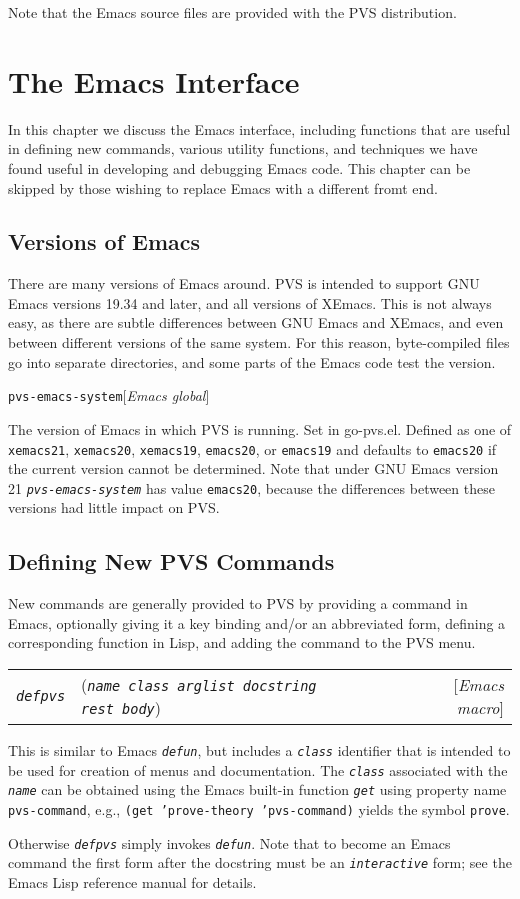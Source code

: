 \documentclass[12pt]{book}
\makeatletter
\newcommand{\indtt}[1]{\texttt{#1}\index{#1@\texttt{#1}}}  %
\def\htgt#1{\hypertarget{#1}{\indtt{#1}}}
\def\amprest{{\smaller\sc {\smaller\smaller \&}rest\ }}
\newenvironment{function}[3]%
{\par\noindent\begin{boxedminipage}{\textwidth}%
 \par\noindent\begin{tabularx}{\linewidth}{l>{\raggedright}Xr}%
 \functionhtgt{#1}&(\texttt{\textit{#2}})&[\emph{#3}]%
 \end{tabularx}\par\flushright\begin{minipage}{.97\textwidth}}
{\end{minipage}\end{boxedminipage}}
\newcommand{\functionnm}[1]{\texttt{\textit{#1}}}
\newcommand{\functionhtgt}[1]{\hypertarget{#1}{\functionnm{#1}}\index{#1@\functionnm{#1}|underline}}
\newenvironment{emacsmacro}[2]%
{\begin{function}{#1}{#2}{Emacs macro}}{\end{function}}
\newenvironment{emacsglobalvar}[1]%
{\par\noindent\begin{boxedminipage}{\textwidth}%
 \par\noindent\texttt{\htgt{#1}}\hfill[\emph{Emacs global}]%
 \par\flushright\begin{minipage}{.97\textwidth}}
{\end{minipage}\end{boxedminipage}}
\makeatother
\begin{document}
Note that the Emacs source files are provided with the PVS distribution.

\section{The Emacs Interface}
\label{emacs-interface}

In this chapter we discuss the Emacs interface, including functions that
are useful in defining new commands, various utility functions, and
techniques we have found useful in developing and debugging Emacs code.
This chapter can be skipped by those wishing to replace Emacs with a
different fromt end.

\subsection{Versions of Emacs}

There are many versions of Emacs around.  PVS is intended to support GNU
Emacs versions 19.34 and later, and all versions of XEmacs.  This is not
always easy, as there are subtle differences between GNU Emacs and XEmacs,
and even between different versions of the same system.  For this reason,
byte-compiled files go into separate directories, and some parts of the
Emacs code test the version.

\begin{emacsglobalvar}{pvs-emacs-system}
The version of Emacs in which PVS is running. Set in go-pvs.el.  Defined
as one of \texttt{xemacs21}, \texttt{xemacs20}, \texttt{xemacs19},
\texttt{emacs20}, or \texttt{emacs19} and defaults to \texttt{emacs20} if
the current version cannot be determined.  Note that under GNU Emacs
version 21 \functionnm{pvs-emacs-system} has value \texttt{emacs20},
because the differences between these versions had little impact on PVS.
\end{emacsglobalvar}

\subsection{Defining New PVS Commands}

New commands are generally provided to PVS by providing a command in
Emacs, optionally giving it a key binding and/or an abbreviated form,
defining a corresponding function in Lisp, and adding the command to the
PVS menu.

\begin{emacsmacro}{defpvs}{name class arglist docstring \amprest body}
This is similar to Emacs \functionnm{defun}, but includes a
\functionnm{class} identifier that is intended to be used for creation of
menus and documentation.  The \functionnm{class} associated with the
\functionnm{name} can be obtained using the Emacs built-in function
\functionnm{get} using property name \texttt{pvs-command}, e.g.,
\texttt{(get 'prove-theory 'pvs-command)} yields the symbol
\texttt{prove}.

Otherwise \functionnm{defpvs} simply invokes \functionnm{defun}.  Note
that to become an Emacs command the first form after the docstring must be
an \functionnm{interactive} form; see the Emacs Lisp reference manual for
details.
\end{emacsmacro}
\end{document}
